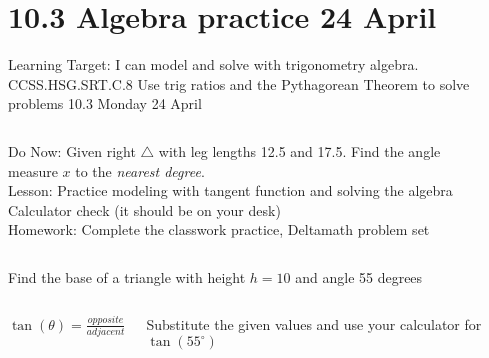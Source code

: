 \documentclass[onlytextwidth, aspectratio=169]{beamer}
\begin{document}
\section{10.3 Algebra practice \hfill 24 April \,}
\begin{frame}{Learning Target: I can model and solve with trigonometry algebra.}
  {CCSS.HSG.SRT.C.8 Use trig ratios and the Pythagorean Theorem to solve problems \hfill \alert{10.3 Monday 24 April}}
  \begin{columns}
    Do Now: Given right $\triangle$ with leg lengths 12.5 and 17.5. Find the angle measure $x$ to the \emph{nearest degree}. \\[0.5cm]
    Lesson: Practice modeling with tangent function and solving the algebra \\
      \alert{Calculator check} (it should be on your desk) \\[0.5cm]
    Homework: Complete the classwork practice, Deltamath problem set
    \begin{flushright}
    \end{flushright}
  \end{columns}
\end{frame}

\begin{frame}{Find the base of a triangle with height $h=10$ and angle 55 degrees}
  \begin{columns}
    \begin{center}
      $\displaystyle \tan(\theta)=\frac{opposite}{adjacent}$
      \end{center}
      Substitute the given values and use your calculator for $\tan(55^\circ)$
    \begin{flushright}
    \end{flushright}
  \end{columns}
\end{frame}
\end{document}
